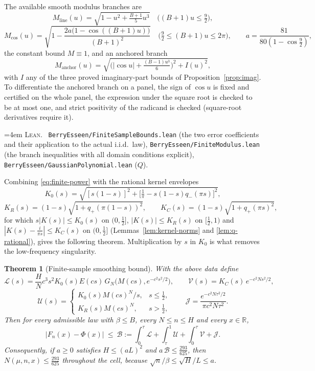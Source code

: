 \documentclass[10pt,a4paper]{article}
\theoremstyle{plain}
\newtheorem{theorem}{Theorem}[section]
\theoremstyle{definition}
\newcommand{\R}{\mathbb{R}}
\newcommand{\file}[1]{\texttt{#1}}
\newenvironment{leanref}%
  {\par\addvspace{3pt}\begingroup\sloppy\emergencystretch=4em
   \noindent\footnotesize\textsc{Lean.}\ \ignorespaces}%
  {\par\endgroup\addvspace{3pt}}
\begin{document}
The available smooth modulus branches are
\[
  M_{\mathrm{line}}(u) = \sqrt{1-u^2+\tfrac{B+1}{5}u^3}
    \quad\bigl((B+1)u\le\tfrac92\bigr),
\]
\[
  M_{\cos}(u) = \sqrt{1-\frac{2a\bigl(1-\cos((B+1)u)\bigr)}{(B+1)^2}}
    \quad\bigl(\tfrac92\le(B+1)u\le2\pi\bigr),
  \qquad a = \frac{81}{80(1-\cos\tfrac92)},
\]
the constant bound $M\equiv1$, and an anchored branch
\[
  M_{\mathrm{anchor}}(u) = \sqrt{\bigl(|\cos u|+\tfrac{(B-1)u^3}{6}\bigr)^2
    + I(u)^2},
\]
with $I$ any of the three proved imaginary-part bounds of
Proposition~\ref{prop:imag}. To differentiate the anchored branch on a panel,
the sign of $\cos u$ is fixed and certified on the whole panel, the expression
under the square root is checked to be at most one, and strict positivity of
the radicand is checked (square-root derivatives require it).

\begin{leanref}
\file{BerryEsseen/FiniteSampleBounds.lean} (the two error coefficients and
their application to the actual i.i.d.\ law),
\file{BerryEsseen/FiniteModulus.lean} (the branch inequalities with all domain
conditions explicit), \file{BerryEsseen/GaussianPolynomial.lean} ($Q$).
\end{leanref}

Combining \eqref{eq:finite-power} with the rational kernel envelopes
\[
  K_0(s) = \sqrt{[s(1-s)]^2+\bigl[\tfrac1\pi-s(1-s)q_-(\pi s)\bigr]^2},
\]
\[
  K_R(s) = (1-s)\sqrt{1+q_+(\pi(1-s))^2},
  \qquad
  K_C(s) = (1-s)\sqrt{1+q_+(\pi s)^2},
\]
for which $s|K(s)|\le K_0(s)$ on $(0,\tfrac12]$, $|K(s)|\le K_R(s)$ on
$[\tfrac12,1)$ and $|K(s)-\tfrac{i}{\pi s}|\le K_C(s)$ on $(0,\tfrac12]$
(Lemmas~\ref{lem:kernel-norms} and \ref{lem:q-rational}), gives the following
theorem. Multiplication by $s$ in $K_0$ is what removes the low-frequency
singularity.

\begin{theorem}[Finite-sample smoothing bound]\label{thm:finite-smoothing}
With the above data define
\[
  \mathcal L(s) = \frac HN c^3s^2K_0(s)E(cs)\,
    G_N\bigl(M(cs),e^{-c^2s^2/2}\bigr),
  \qquad
  \mathcal V(s) = K_C(s)\,e^{-c^2Ns^2/2},
\]
\[
  \mathcal U(s) =
  \begin{cases}
    K_0(s)M(cs)^N/s, & s\le\tfrac12,\\
    K_R(s)M(cs)^N, & s>\tfrac12,
  \end{cases}
  \qquad
  \mathcal J = \frac{e^{-c^2N\tau^2/2}}{\pi c^2N\tau^2} .
\]
Then for every admissible law with $\beta\le B$, every $N\le n\le H$ and every
$x\in\R$,
\[
  \boxed{\ \bigl|F_n(x)-\Phi(x)\bigr| \ \le\
  \mathcal B := \int_0^\tau\mathcal L
    + \int_\tau^1\mathcal U
    + \int_0^\tau\mathcal V
    + \mathcal J . \ }
\]
Consequently, if $a\ge0$ satisfies $H\le(aL)^2$ and
$a\,\mathcal B\le\tfrac{293}{625}$, then $N(\mu,n,x)\le\tfrac{293}{625}$
throughout the cell, because
$\sqrt n/\beta\le\sqrt H/L\le a$.
\end{theorem}
\end{document}
